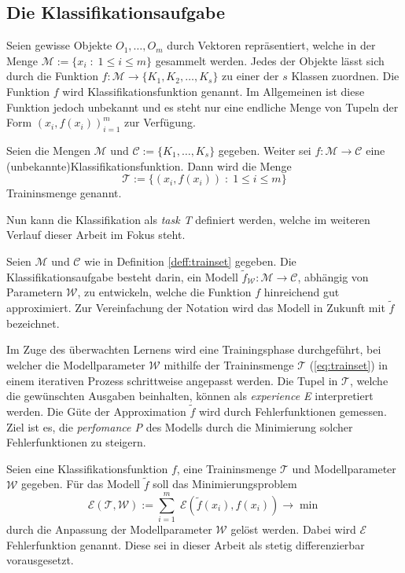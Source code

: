 \subsection{Die Klassifikationsaufgabe}
\label{abs:classtask}
Seien gewisse Objekte $O_1, \ldots, O_m$ durch Vektoren repräsentiert, welche in der Menge $\mathcal{M}:=\{x_i \; : \; 1 \leq i \leq m \}$ gesammelt werden. Jedes der Objekte lässt sich durch die Funktion $f:\mathcal{M} \rightarrow \{K_1, K_2, \ldots, K_s\}$ zu einer der $s$ Klassen zuordnen. Die Funktion $f$ wird Klassifikationsfunktion genannt. Im Allgemeinen ist diese Funktion jedoch unbekannt und es steht nur eine endliche Menge von Tupeln der Form $(x_i, f(x_i))_{i=1}^m$ zur Verfügung. 
\begin{defi}[Trainingsmenge]
    \label{deff:trainset}
    Seien die Mengen $\mathcal{M}$ und $\mathcal{C}:=\{K_1, \ldots, K_s \}$ gegeben. Weiter sei $f: \mathcal{M} \rightarrow \mathcal{C}$ eine (unbekannte)Klassifikationsfunktion. Dann wird die Menge 
    \begin{equation}
        \label{eq:trainset}
        \mathcal{T}:=\{(x_i, f(x_i))\; : \; 1 \leq i \leq m\}
    \end{equation} Traininsmenge genannt. 
\end{defi}
Nun kann die Klassifikation als \textit{task T} definiert werden, welche im weiteren Verlauf dieser Arbeit im Fokus steht.
\begin{defi}[Klassifikationsaufgabe]
    Seien $\mathcal{M}$ und $\mathcal{C}$ wie in Definition \ref{deff:trainset} gegeben. Die Klassifikationsaufgabe besteht darin, ein Modell $\tilde{f}_{\mathcal{W}}:\mathcal{M} \rightarrow \mathcal{C}$, abhängig von Parametern $\mathcal{W}$, zu entwickeln, welche die Funktion $f$ hinreichend gut approximiert. Zur Vereinfachung der Notation wird das Modell in Zukunft mit $\tilde{f}$ bezeichnet.
\end{defi}
Im Zuge des überwachten Lernens wird eine Trainingsphase durchgeführt, bei welcher die Modellparameter $\mathcal{W}$ mithilfe der Traininsmenge $\mathcal{T}$ (\ref{eq:trainset}) in einem iterativen Prozess schrittweise angepasst werden. Die Tupel in $\mathcal{T}$, welche die gewünschten Ausgaben beinhalten, können als \textit{experience E} interpretiert werden.
Die Güte der Approximation $\tilde{f}$ wird durch Fehlerfunktionen gemessen. Ziel ist es, die \textit{perfomance P} des Modells durch die Minimierung solcher Fehlerfunktionen zu steigern.  
\begin{defi}
    Seien eine Klassifikationsfunktion $f$, eine Traininsmenge $\mathcal{T}$ und Modellparameter $\mathcal{W}$ gegeben. Für das Modell $\tilde{f}$ soll das Minimierungsproblem 
    \begin{equation}
        \label{eq:opt_fund_abs}
        \mathcal{E}(\mathcal{T}, \mathcal{W}):=\sum_{i=1}^m \; \mathcal{E}(\tilde{f}(x_i),f(x_i)) \rightarrow \min
    \end{equation}
    durch die Anpassung der Modellparameter $\mathcal{W}$ gelöst werden. Dabei wird $\mathcal{E}$ Fehlerfunktion genannt. Diese sei in dieser Arbeit als stetig differenzierbar vorausgesetzt.
\end{defi}
